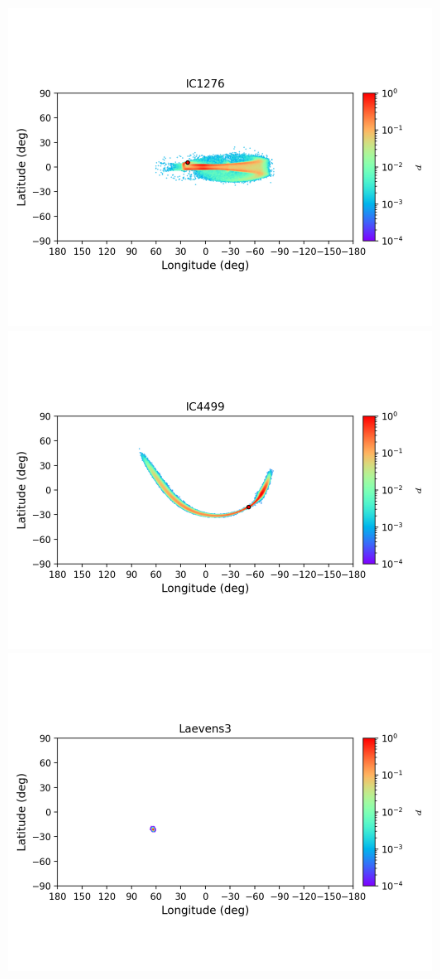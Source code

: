 \begin{figure}
        \includegraphics[clip=true, trim = 0mm 20mm 0mm 10mm, width=1\columnwidth]{images/error_plots_IC1276.png}
        \includegraphics[clip=true, trim = 0mm 20mm 0mm 10mm, width=1\columnwidth]{images/error_plots_IC4499.png}
        \includegraphics[clip=true, trim = 0mm 20mm 0mm 10mm, width=1\columnwidth]{images/error_plots_Laevens3.png}

\end{figure}
